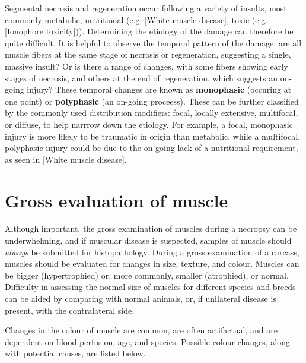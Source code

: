 \documentclass[openany]{book}
\begin{document}
Segmental necrosis and regeneration occur following a variety of
insults, most commonly metabolic, nutritional (e.g. {[}White muscle
disease{]}, toxic (e.g. {[}Ionophore toxicity{]})). Determining the
etiology of the damage can therefore be quite difficult. It is helpful
to observe the temporal pattern of the damage: are all muscle fibers at
the same stage of necrosis or regeneration, suggesting a single, massive
insult? Or is there a range of changes, with some fibers showing early
stages of necrosis, and others at the end of regeneration, which
suggests an on-going injury? These temporal changes are known as
\textbf{monophasic} (occuring at one point) or \textbf{polyphasic} (an
on-going proceess). These can be further classified by the commonly used
distribution modifiers: focal, locally extensive, multifocal, or
diffuse, to help narrrow down the etiology. For example, a focal,
monophasic injury is more likely to be traumatic in origin than
metabolic, while a multifocal, polyphasic injury could be due to the
on-going lack of a nutritional requirement, as seen in {[}White muscle
disease{]}.

\section{Gross evaluation of muscle}\label{gross-evaluation-of-muscle}

Although important, the gross examination of muscles during a necropsy
can be underwhelming, and if muscular disease is suspected, samples of
muscle should \emph{always} be submitted for histopathology. During a
gross examination of a carcass, muscles should be evaluated for changes
in size, texture, and colour. Muscles can be bigger (hypertrophied) or,
more commonly, smaller (atrophied), or normal. Difficulty in assessing
the normal size of muscles for different species and breeds can be aided
by comparing with normal animals, or, if unilateral disease is present,
with the contralateral side.

Changes in the colour of muscle are common, are often artifactual, and
are dependent on blood perfusion, age, and species. Possible colour
changes, along with potential causes, are listed below.
\end{document}

